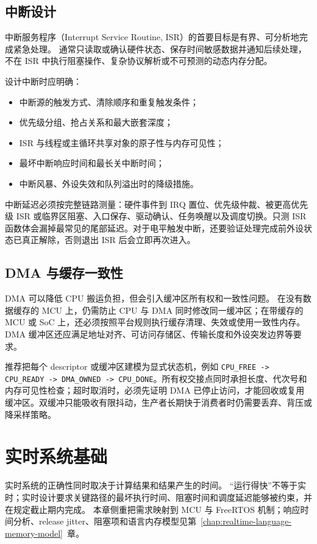 \subsection{中断设计}

中断服务程序（Interrupt Service Routine, ISR）的首要目标是有界、可分析地完成紧急处理。
通常只读取或确认硬件状态、保存时间敏感数据并通知后续处理，不在 ISR 中执行阻塞操作、复杂协议解析或不可预测的动态内存分配。

设计中断时应明确：
\begin{itemize}
  \item 中断源的触发方式、清除顺序和重复触发条件；
  \item 优先级分组、抢占关系和最大嵌套深度；
  \item ISR 与线程或主循环共享对象的原子性与内存可见性；
  \item 最坏中断响应时间和最长关中断时间；
  \item 中断风暴、外设失效和队列溢出时的降级措施。
\end{itemize}

中断延迟必须按完整链路测量：硬件事件到 IRQ 置位、优先级仲裁、被更高优先级 ISR 或临界区阻塞、入口保存、驱动确认、任务唤醒以及调度切换。只测 ISR 函数体会漏掉最常见的尾部延迟。对于电平触发中断，还要验证处理完成前外设状态已真正解除，否则退出 ISR 后会立即再次进入。

\subsection{DMA 与缓存一致性}

DMA 可以降低 CPU 搬运负担，但会引入缓冲区所有权和一致性问题。
在没有数据缓存的 MCU 上，仍需防止 CPU 与 DMA 同时修改同一缓冲区；在带缓存的 MCU 或 SoC 上，还必须按照平台规则执行缓存清理、失效或使用一致性内存。
DMA 缓冲区还应满足地址对齐、可访问存储区、传输长度和外设突发边界等要求。

推荐把每个 descriptor 或缓冲区建模为显式状态机，例如 \texttt{CPU\_FREE -> CPU\_READY -> DMA\_OWNED -> CPU\_DONE}。所有权交接点同时承担长度、代次号和内存可见性检查；超时取消时，必须先证明 DMA 已停止访问，才能回收或复用缓冲区。双缓冲只能吸收有限抖动，生产者长期快于消费者时仍需要丢弃、背压或降采样策略。

\section{实时系统基础}

实时系统的正确性同时取决于计算结果和结果产生的时间。
“运行得快”不等于实时；实时设计要求关键路径的最坏执行时间、阻塞时间和调度延迟能够被约束，并在规定截止期内完成。
本章侧重把需求映射到 MCU 与 FreeRTOS 机制；响应时间分析、release jitter、阻塞项和语言内存模型见第~\ref{chap:realtime-language-memory-model}~章。

